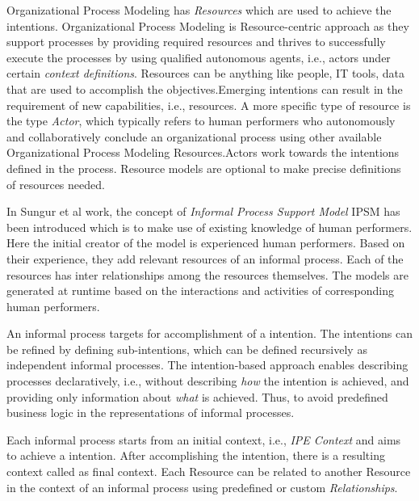 \hspace{4ex} Organizational Process Modeling  has \textit{Resources} which are used to achieve the intentions. Organizational Process Modeling is Resource-centric approach as they support processes by providing required resources and thrives to successfully execute the processes by using qualified autonomous agents, i.e., actors under certain \textit{context definitions}.  Resources can be anything like people, IT tools, data that are used to accomplish the objectives.Emerging intentions can result in the requirement of new capabilities, i.e., resources. A more specific type of resource is the type \textit{Actor}, which typically refers to human performers who autonomously and collaboratively conclude an organizational process using other available Organizational Process Modeling Resources.Actors work towards the intentions defined in the process. Resource models are optional to make precise definitions of resources needed.

\hspace{4ex} In Sungur et al \cite{Sungur2014a} work, the concept of \textit{Informal Process Support Model} IPSM has been introduced which is to make use of existing knowledge of human performers. Here the initial creator of the model is experienced human performers. Based on their experience, they add relevant  resources of an informal process. Each of the resources has inter relationships among the resources themselves. The models are generated at runtime based on the interactions and activities of corresponding human performers. 

\hspace{4ex} An informal process targets for accomplishment of a intention. The intentions can be refined by defining sub-intentions, which can be defined recursively as independent informal processes. The intention-based approach enables describing processes declaratively, i.e., without describing \textit{how} the intention is achieved, and providing only information about \textit{what} is achieved. Thus, to avoid predefined business logic in the representations of informal processes. 

\hspace{4ex} Each informal process starts from an initial context, i.e., \textit{IPE Context} and aims to achieve a intention. After accomplishing the intention, there is a resulting context called as final context. Each Resource can be related to another Resource in the context of an informal process using predefined or custom \textit{Relationships}.

